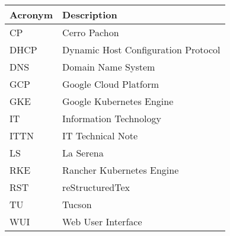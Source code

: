 \addtocounter{table}{-1}
\begin{longtable}{p{}p{}}\hline
\textbf{Acronym} & \textbf{Description}  \\\hline

CP & Cerro Pachon \\\hline
DHCP & Dynamic Host Configuration Protocol \\\hline
DNS & Domain Name System \\\hline
GCP & Google Cloud Platform \\\hline
GKE & Google Kubernetes Engine \\\hline
IT & Information Technology \\\hline
ITTN & IT Technical Note \\\hline
LS & La Serena \\\hline
RKE & Rancher Kubernetes Engine \\\hline
RST & reStructuredTex \\\hline
TU & Tucson \\\hline
WUI & Web User Interface \\\hline
\end{longtable}
